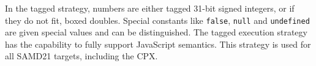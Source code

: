 In the tagged strategy, numbers are either tagged 31-bit signed integers, or if they do not fit,
boxed doubles. Special constants like \texttt{false}, \texttt{null} and \texttt{undefined} are given special values
and can be distinguished. The tagged execution strategy has the capability to fully support
JavaScript semantics. This strategy is used for all SAMD21 targets, including the CPX.




